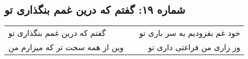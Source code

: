 \begin{center}
\section*{شماره ۱۹: گفتم که درین غمم بنگذاری تو}
\label{sec:019}
\begin{longtable}{l p{0.5cm} r}
گفتم که درین غمم بنگذاری تو
&&
خود غم بفزودیم به سر باری تو
\\
وین از همه سخت تر که میزارم من
&&
وز زاری من فراغتی داری تو
\\
\end{longtable}
\end{center}
